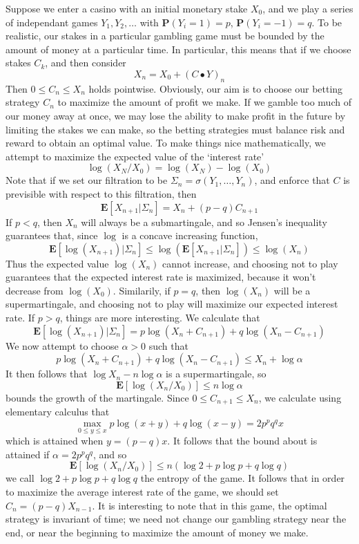 \begin{example}
    Suppose we enter a casino with an initial monetary stake $X_0$, and we play a series of independant games $Y_1, Y_2, \dots$ with $\mathbf{P}(Y_i = 1) = p$, $\mathbf{P}(Y_i = -1) = q$. To be realistic, our stakes in a particular gambling game must be bounded by the amount of money at a particular time. In particular, this means that if we choose stakes $C_k$, and then consider
    \[ X_n = X_0 + (C \bullet Y)_n \]
    Then $0 \leq C_n \leq X_n$ holds pointwise. Obviously, our aim is to choose our betting strategy $C_n$ to maximize the amount of profit we make. If we gamble too much of our money away at once, we may lose the ability to make profit in the future by limiting the stakes we can make, so the betting strategies must balance risk and reward to obtain an optimal value. To make things nice mathematically, we attempt to maximize the expected value of the `interest rate'
    \[ \log(X_N/X_0) = \log(X_N) - \log(X_0) \]
    Note that if we set our filtration to be $\Sigma_n = \sigma(Y_1, \dots, Y_n)$, and enforce that $C$ is previsible with respect to this filtration, then
    \[ \mathbf{E}[X_{n+1}|\Sigma_n] = X_n + (p-q)C_{n+1} \]
    If $p < q$, then $X_n$ will always be a submartingale, and so Jensen's inequality guarantees that, since $\log$ is a concave increasing function,
    \[ \mathbf{E}[\log(X_{n+1})|\Sigma_n] \leq \log(\mathbf{E}[X_{n+1}|\Sigma_n]) \leq \log(X_n) \]
    Thus the expected value $\log(X_n)$ cannot increase, and choosing not to play guarantees that the expected interest rate is maximized, because it won't decrease from $\log(X_0)$. Similarily, if $p = q$, then $\log(X_n)$ will be a supermartingale, and choosing not to play will maximize our expected interest rate. If $p > q$, things are more interesting. We calculate that
    \[ \mathbf{E}[\log(X_{n+1})|\Sigma_n] = p\log(X_n + C_{n+1}) + q\log(X_n - C_{n+1}) \]
    We now attempt to choose $\alpha > 0$ such that
    \[ p \log(X_n + C_{n+1}) + q\log(X_n - C_{n+1}) \leq X_n + \log \alpha \]
    It then follows that $\log X_n - n \log \alpha$ is a supermartingale, so
    \[ \mathbf{E}[\log(X_n/X_0)] \leq n \log \alpha \]
    bounds the growth of the martingale. Since $0 \leq C_{n+1} \leq X_n$, we calculate using elementary calculus that
    \[ \max_{0 \leq y \leq x} p\log(x + y) + q\log(x-y) = 2p^p q^q x \]
    which is attained when $y = (p-q)x$. It follows that the bound about is attained if $\alpha = 2p^pq^q$, and so
    \[ \mathbf{E}[\log(X_n/X_0)] \leq n (\log 2 + p \log p + q \log q) \]
    we call $\log 2 + p \log p + q \log q$ the entropy of the game. It follows that in order to maximize the average interest rate of the game, we should set $C_n = (p-q)X_{n-1}$. It is interesting to note that in this game, the optimal strategy is invariant of time; we need not change our gambling strategy near the end, or near the beginning to maximize the amount of money we make.
\end{example}

